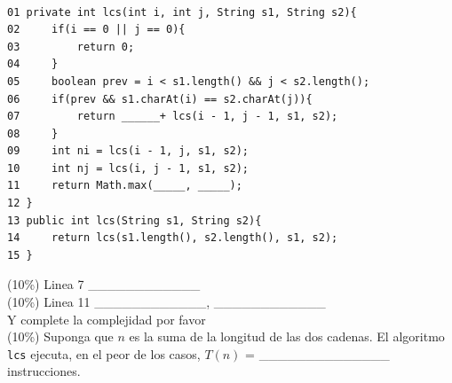 \documentclass[twocolumn]{article}
\begin{document}
{\footnotesize
\begin{verbatim}











01 private int lcs(int i, int j, String s1, String s2){
02     if(i == 0 || j == 0){
03         return 0;   
04     }
05     boolean prev = i < s1.length() && j < s2.length();
06     if(prev && s1.charAt(i) == s2.charAt(j)){
07         return ______+ lcs(i - 1, j - 1, s1, s2);
08     }
09     int ni = lcs(i - 1, j, s1, s2);
10     int nj = lcs(i, j - 1, s1, s2);
11     return Math.max(_____, _____);
12 }
13 public int lcs(String s1, String s2){
14     return lcs(s1.length(), s2.length(), s1, s2);
15 }
\end{verbatim}
}

 (10\%) Linea 7  \_\_\_\_\_\_\_\_\_\_\_\_ \\

 (10\%) Linea 11 \_\_\_\_\_\_\_\_\_\_\_\_, \_\_\_\_\_\_\_\_\_\_\_\_ \\

Y complete la complejidad por favor \\
 
 (10\%) Suponga que $n$ es la suma de la longitud de las dos cadenas. El algoritmo \texttt{lcs} ejecuta, en el
 peor de los casos, $T(n)$ = \_\_\_\_\_\_\_\_\_\_\_\_\_\_ instrucciones. \\
\end{document}
